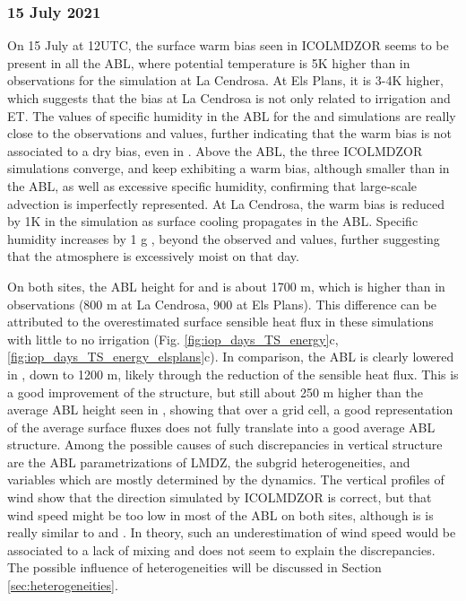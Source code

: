 \subsubsection*{15 July 2021}
On 15 July at 12UTC, the surface warm bias seen in ICOLMDZOR seems to be present in all the ABL, where potential temperature is 5K higher than in observations for the \noirr simulation at La Cendrosa. At Els Plans, it is 3-4K higher, which suggests that the bias at La Cendrosa is not only related to irrigation and ET. 
The values of specific humidity in the ABL for the \noirr and \irr simulations are really close to the observations and \mesomean values, further indicating that the warm bias is not associated to a dry bias, even in \noirr.
Above the ABL, the three ICOLMDZOR simulations converge, and keep exhibiting a warm bias, although smaller than in the ABL, as well as excessive specific humidity, confirming that large-scale advection is imperfectly represented.
At La Cendrosa, the warm bias is reduced by 1K in the \irrboost simulation as surface cooling propagates in the ABL. Specific humidity increases by 1 g \perkg, beyond the observed and \mesomean values, further suggesting that the atmosphere is excessively moist on that day.

On both sites, the ABL height for \noirr and \irr is about 1700 m, which is higher than in observations (800 m at La Cendrosa, 900 at Els Plans). This difference can be attributed to the overestimated surface sensible heat flux in these simulations with little to no irrigation (Fig. \ref{fig:iop_days_TS_energy}c,  \ref{fig:iop_days_TS_energy_elsplans}c). 
In comparison, the ABL is clearly lowered in \irrboost, down to 1200 m, likely through the reduction of the sensible heat flux. This is a good improvement of the structure, but still about 250 m higher than the average ABL height seen in \mesomean, showing that over a grid cell, a good representation of the average surface fluxes does not fully translate into a good average ABL structure.
Among the possible causes of such discrepancies in vertical structure are the ABL parametrizations of LMDZ, the subgrid heterogeneities, and variables which are mostly determined by the dynamics. The vertical profiles of wind show that the direction simulated by ICOLMDZOR is correct, but that wind speed might be too low in most of the ABL on both sites, although is is really similar to \mesomean and \mesoexact. In theory, such an underestimation of wind speed would be associated to a lack of mixing and does not seem to explain the discrepancies. The possible influence of heterogeneities will be discussed in Section \ref{sec:heterogeneities}.

